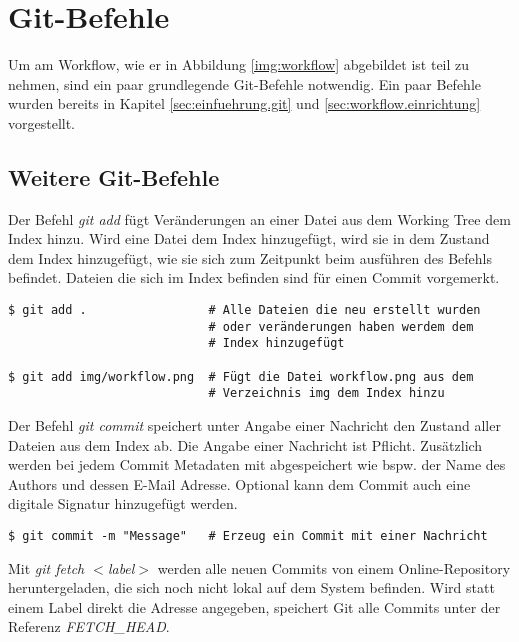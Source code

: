 \section{Git-Befehle}
\label{sec:git-commands}

Um am Workflow, wie er in Abbildung \ref{img:workflow} abgebildet ist teil zu nehmen, sind ein paar grundlegende Git-Befehle notwendig. Ein paar Befehle wurden bereits in Kapitel \ref{sec:einfuehrung.git} und \ref{sec:workflow.einrichtung} vorgestellt.

\subsection{Weitere Git-Befehle}
\label{sec:git-commands.advanced}

\label{sec:git-commands.advanced.add}
Der Befehl \textit{git add} fügt Veränderungen an einer Datei aus dem Working Tree dem Index hinzu. Wird eine Datei dem Index hinzugefügt, wird sie in dem Zustand dem Index hinzugefügt, wie sie sich zum Zeitpunkt beim ausführen des Befehls befindet. Dateien die sich im Index befinden sind für einen Commit vorgemerkt.

\begin{verbatim}
$ git add .                 # Alle Dateien die neu erstellt wurden
                            # oder veränderungen haben werdem dem
                            # Index hinzugefügt

$ git add img/workflow.png  # Fügt die Datei workflow.png aus dem
                            # Verzeichnis img dem Index hinzu
\end{verbatim}

\label{sec:git-commands.advanced.commit}
Der Befehl \textit{git commit} speichert unter Angabe einer Nachricht den Zustand aller Dateien aus dem Index ab. Die Angabe einer Nachricht ist Pflicht. Zusätzlich werden bei jedem Commit Metadaten mit abgespeichert wie bspw. der Name des Authors und dessen E-Mail Adresse. Optional kann dem Commit auch eine digitale Signatur hinzugefügt werden.

\begin{verbatim}
$ git commit -m "Message"   # Erzeug ein Commit mit einer Nachricht
\end{verbatim}

\label{sec:git-commands.advanced.fetch}
Mit \textit{git fetch $ < $label$ > $} werden alle neuen Commits von einem Online-Repository heruntergeladen, die sich noch nicht lokal auf dem System befinden. Wird statt einem Label direkt die Adresse angegeben, speichert Git alle Commits unter der Referenz \textit{FETCH\_HEAD}.

